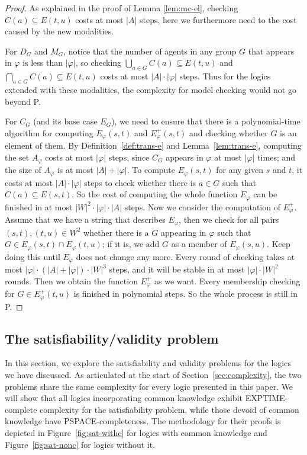 \documentclass{article}
\renewcommand{\phi}{\varphi}
\begin{document}
\begin{proof}
As explained in the proof of Lemma \ref{lem:mc-el}, checking $C(a) \subseteq E(t,u)$ costs at most $|A|$ steps, here we furthermore need to the cost caused by the new modalities.

For $D_G$ and $M_G$, notice that the number of agents in any group $G$ that appears in $\phi$ is less than $|\phi|$, so checking $\bigcup_{a \in G} C(a)\subseteq E(t,u)$ and $\bigcap_{a \in G} C(a)\subseteq E(t,u)$ costs at most $|A| \cdot |\phi|$ steps. Thus for the logics extended with these modalities, the complexity for model checking would not go beyond P.

For $C_G$ (and its base case $E_G$), we need to ensure that there is a polynomial-time algorithm for computing $E_\phi(s,t)$ and $E^+_{\phi}(s,t)$ and checking whether $G$ is an element of them. By Definition~\ref{def:trans-e} and Lemma~\ref{lem:trans-e}, computing the set $A_\phi$ costs at most $|\phi|$ steps, since $C_G$ appears in $\phi$ at most $|\phi|$ times; and the size of $A_\phi$ is at most $|A|+ |\phi|$. To compute $E_\phi(s,t)$ for any given $s$ and $t$, it costs at most $|A| \cdot |\phi|$ steps to check whether there is $a\in G$ such that $C(a)\subseteq E(s,t)$. So the cost of computing the whole function $E_\phi$ can be finished in at most $|W|^2 \cdot |\phi| \cdot |A|$ steps.
Now we consider the computation of $E^+_{\phi}$. Assume that we have a string that describes $E_\phi$, then we check for all pairs $(s,t),(t,u)\in W^2$ whether there is a $G$ appearing in $\phi$ such that $G\in E_\phi(s,t)\cap E_\phi(t,u)$; if it is, we add $G$ as a member of $E_\phi(s,u)$. Keep doing this until $E_\phi$ does not change any more. Every round of checking takes at most $|\phi| \cdot (|A|+|\phi|)\cdot|W|^3$ steps, and it will be stable in at most $|\phi|\cdot|W|^2$ rounds. Then we obtain the function $E^+_{\phi}$ as we want. Every membership checking for $G\in E^+_{\phi}(t,u)$ is finished in polynomial steps. So the whole process is still in P.
\end{proof}



\subsection{The satisfiability/validity problem}
\label{sec:sat}

In this section, we explore the satisfiability and validity problems for the logics we have discussed. As articulated at the start of  Section~\ref{sec:complexity}, the two problems share the same complexity for every logic presented in this paper. We will show that all logics incorporating common knowledge exhibit EXPTIME-complete complexity for the satisfiability problem, while those devoid of common knowledge have PSPACE-completeness. The methodology for their proofs is depicted in Figure~\ref{fig:sat-withc} for logics with common knowledge and Figure~\ref{fig:sat-nonc} for logics without it.
\end{document}
